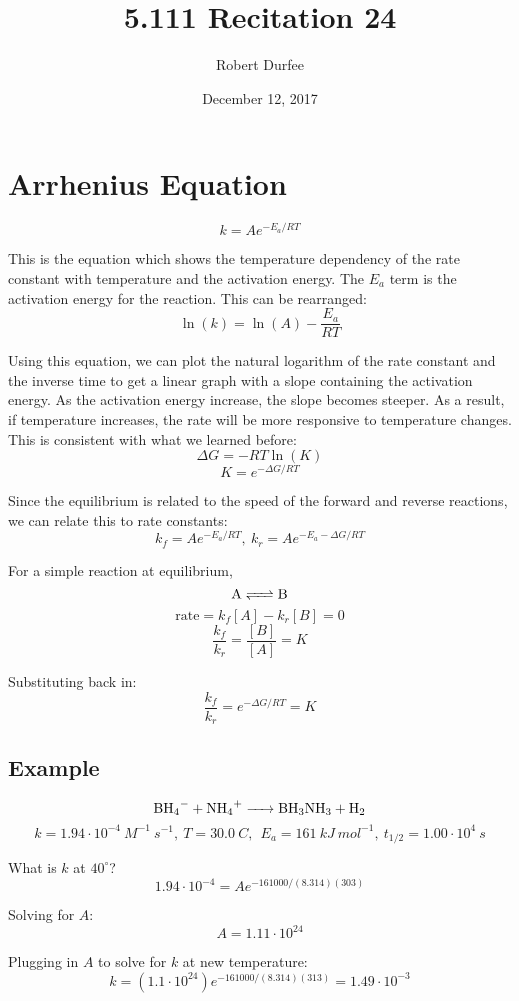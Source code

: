 \documentclass{article}
\title{ 5.111 Recitation 24 }
\author{ Robert Durfee }
\date{ December 12, 2017 }
\begin{document}
\maketitle

\section{ Arrhenius Equation }

$$ k = A e^{-E_{a} / RT} $$

This is the equation which shows the temperature dependency of the rate constant
with temperature and the activation energy. The $E_{a}$ term is the activation
energy for the reaction. This can be rearranged:
$$ \ln(k) = \ln(A) - \frac{ E_{a} }{ RT }$$

Using this equation, we can plot the natural logarithm of the rate constant and
the inverse time to get a linear graph with a slope containing the activation
energy. As the activation energy increase, the slope becomes steeper. As a
result, if temperature increases, the rate will be more responsive to
temperature changes. This is consistent with what we learned before:
$$ \Delta G = -RT \ln(K) $$
$$  K = e^{-\Delta G / RT} $$

Since the equilibrium is related to the speed of the forward and reverse
reactions, we can relate this to rate constants:
$$ k_{f} = Ae^{-E_{a} / RT},\ k_{r} = Ae^{-E_{a} - \Delta G / RT} $$

For a simple reaction at equilibrium,
$$ \ce{ A <=> B } $$
$$ \mathrm{rate} = k_{f}[ A ] - k_{r}[ B ] = 0$$
$$ \frac{ k_{f} }{ k_{r} } = \frac{ [B] }{ [A] } = K$$

Substituting back in:
$$  \frac{ k_{f} }{ k_{r} } = e^{-\Delta G / RT} = K $$

\subsection{Example}

$$ \ce{ BH_{4}- + NH_{4}+ -> BH_{3}NH_{3} + H_{2} } $$
$$ k = 1.94 \cdot 10^{-4}\ \si{ M^{-1}\ s^{-1} },\ T = 30.0\ \si{ C },\ \
E_{a} = 161\ \si{ kJ\ mol^{-1} },\ t_{1/2} = 1.00 \cdot 10^{4}\ \si{ s }$$

What is $k$ at $40^{\circ}$?
$$ 1.94 \cdot 10^{-4} = A e^{-161000 / (8.314) (303) } $$

Solving for $A$:
$$ A = 1.11 \cdot 10^{24} $$

Plugging in $A$ to solve for $k$ at new temperature:
$$ k = (1.1 \cdot 10^{24}) e^{-161000 / (8.314)(313)} = 1.49 \cdot 10^{-3} $$
\end{document}
